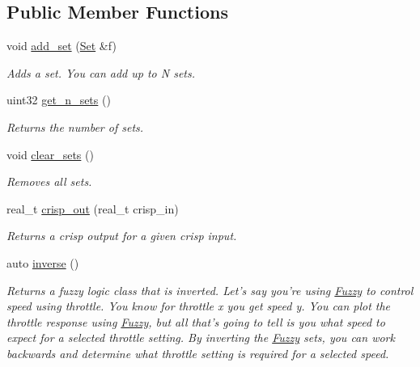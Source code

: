 \subsection*{Public Member Functions}
\begin{DoxyCompactItemize}
\item 
\hypertarget{classetk_1_1_fuzzy_abe817aa98e6ad63a9d0f9d28aa917d7a}{void \hyperlink{classetk_1_1_fuzzy_abe817aa98e6ad63a9d0f9d28aa917d7a}{add\-\_\-set} (\hyperlink{classetk_1_1_fuzzy_1_1_set}{Set} \&f)}\label{classetk_1_1_fuzzy_abe817aa98e6ad63a9d0f9d28aa917d7a}

\begin{DoxyCompactList}\small\item\em Adds a set. You can add up to N sets. \end{DoxyCompactList}\item 
\hypertarget{classetk_1_1_fuzzy_a2d10f9ca458595dfb404094903eb82e3}{uint32 \hyperlink{classetk_1_1_fuzzy_a2d10f9ca458595dfb404094903eb82e3}{get\-\_\-n\-\_\-sets} ()}\label{classetk_1_1_fuzzy_a2d10f9ca458595dfb404094903eb82e3}

\begin{DoxyCompactList}\small\item\em Returns the number of sets. \end{DoxyCompactList}\item 
\hypertarget{classetk_1_1_fuzzy_a000d2dcf15ab0aa1d6cb9b7a528c2ed4}{void \hyperlink{classetk_1_1_fuzzy_a000d2dcf15ab0aa1d6cb9b7a528c2ed4}{clear\-\_\-sets} ()}\label{classetk_1_1_fuzzy_a000d2dcf15ab0aa1d6cb9b7a528c2ed4}

\begin{DoxyCompactList}\small\item\em Removes all sets. \end{DoxyCompactList}\item 
real\-\_\-t \hyperlink{classetk_1_1_fuzzy_a5034d3a6a627d478e65ceade3b8a6171}{crisp\-\_\-out} (real\-\_\-t crisp\-\_\-in)
\begin{DoxyCompactList}\small\item\em Returns a crisp output for a given crisp input. \end{DoxyCompactList}\item 
auto \hyperlink{classetk_1_1_fuzzy_a4a4952392e6950a71734304a8b880fab}{inverse} ()
\begin{DoxyCompactList}\small\item\em Returns a fuzzy logic class that is inverted. Let's say you're using \hyperlink{classetk_1_1_fuzzy}{Fuzzy} to control speed using throttle. You know for throttle x you get speed y. You can plot the throttle response using \hyperlink{classetk_1_1_fuzzy}{Fuzzy}, but all that's going to tell is you what speed to expect for a selected throttle setting. By inverting the \hyperlink{classetk_1_1_fuzzy}{Fuzzy} sets, you can work backwards and determine what throttle setting is required for a selected speed. \end{DoxyCompactList}\end{DoxyCompactItemize}


